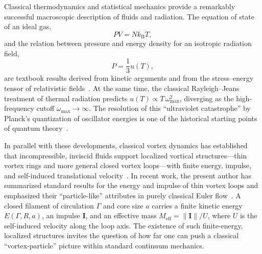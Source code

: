 \documentclass[11pt]{article}
\begin{document}
        Classical thermodynamics and statistical mechanics provide a remarkably successful macroscopic
        description of fluids and radiation. The equation of state of an ideal gas,
        \begin{equation}
            P V = N k_{\mathrm B} T,
        \end{equation}
        and the relation between pressure and energy density for an isotropic radiation field,
        \begin{equation}
            P = \frac{1}{3} u(T),
        \end{equation}
        are textbook results derived from kinetic arguments and from the stress--energy tensor of
        relativistic fields~\cite{LandauLifshitz_StatPhys,Reif,LandauLifshitz_Fields}.
        At the same time, the classical Rayleigh--Jeans treatment of thermal radiation predicts
        $u(T) \propto T\,\omega_{\max}^2$, diverging as the high-frequency cutoff $\omega_{\max}\to\infty$.
        The resolution of this ``ultraviolet catastrophe'' by Planck's quantization of oscillator
        energies is one of the historical starting points of quantum theory~\cite{Planck1901,Rayleigh1900,Jeans1905}.

        In parallel with these developments, classical vortex dynamics has established that
        incompressible, inviscid fluids support localized vortical structures---thin vortex rings and
        more general closed vortex loops---with finite energy, impulse, and self-induced translational
        velocity~\cite{Batchelor1967,Saffman1992}. In recent work, the present author has summarized
        standard results for the energy and impulse of thin vortex loops and emphasized their
        ``particle-like'' attributes in purely classical Euler flow~\cite{Iskandarani2025_VortexLoops}.
        A closed filament of circulation $\Gamma$ and core size $a$ carries a finite kinetic energy
        $E(\Gamma,R,a)$, an impulse $\boldsymbol{I}$, and an effective mass
        $M_{\mathrm{eff}} = \|\boldsymbol{I}\|/U$, where $U$ is the self-induced velocity along the loop axis.
        The existence of such finite-energy, localized structures invites the question of how far
        one can push a classical ``vortex-particle'' picture within standard continuum mechanics.
\end{document}
